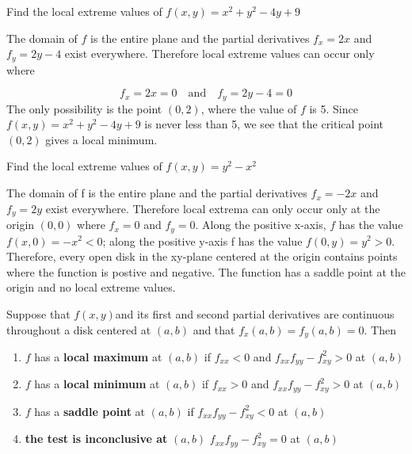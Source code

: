 \documentclass[12pt,a4paper]{article}
\newenvironment{theorem}{\begin{theorembox}}{\end{theorembox}\vspace{1\baselineskip}}
\newcommand{\fxy}{\(f(x,y)\)}
\begin{document}
\begin{example}
    Find the local extreme values of \(f(x,y) = x^2 + y^2 -4y +9\)
\end{example}

\begin{solution}
    The domain of \(f\) is the entire plane and the partial derivatives \(f_x = 2x\) and \(f_y = 2y -4\) exist everywhere. Therefore local extreme values can occur only where

    \[f_x = 2x = 0 \quad \text{and} \quad f_y = 2y-4 = 0\] 
    The only possibility is the point \((0,2)\), where the value of \(f\) is 5. Since \(f(x,y) = x^2 + y^2 -4y +9\)  is never less than 5, we see that the critical point \((0,2)\) gives a local minimum.

\end{solution}

\begin{example}
    Find the local extreme values of \(f(x,y) = y^2 - x^2\)

    \begin{solution}
        The domain of f is the entire plane and the partial derivatives \(f_x = -2x\) and \(f_y = 2y\) exist everywhere. Therefore local extrema can only occur only at the origin \((0,0)\) where \(f_x = 0\) and \(f_y = 0\).
        Along the positive x-axis, \(f\) has the value \(f(x,0) = -x^2 < 0\); along the positive y-axis f has the value \(f(0,y) = y^2 > 0\). Therefore, every open disk in the xy-plane centered at the origin contains points where the function is postive and negative. The function has a saddle point at the origin and no local extreme values.
    \end{solution}

\end{example}

\begin{theorem}
    Suppose that \fxy and its first and second partial derivatives are continuous throughout a disk centered at \((a,b)\) and that \(f_x(a,b) = f_y(a,b)=0\). Then
    \begin{enumerate}
        \item \(f\) has a \textbf{local maximum} at \((a,b)\) if \(f_{xx} < 0\) and \(f_{xx}f_{yy}-f_{xy}^2 > 0\) at \((a,b)\)
        \item \(f\) has a \textbf{local minimum} at \((a,b)\) if \(f_{xx} > 0\) and \(f_{xx}f_{yy}-f_{xy}^2 > 0\) at \((a,b)\)
        \item \(f\) has a \textbf{saddle point} at \((a,b)\) if  \(f_{xx}f_{yy}-f_{xy}^2 < 0\) at \((a,b)\)
        \item \textbf{the test is inconclusive at}  \((a,b)\) \(f_{xx}f_{yy}-f_{xy}^2 = 0\) at \((a,b)\)
    \end{enumerate}
\end{theorem}
\end{document}
